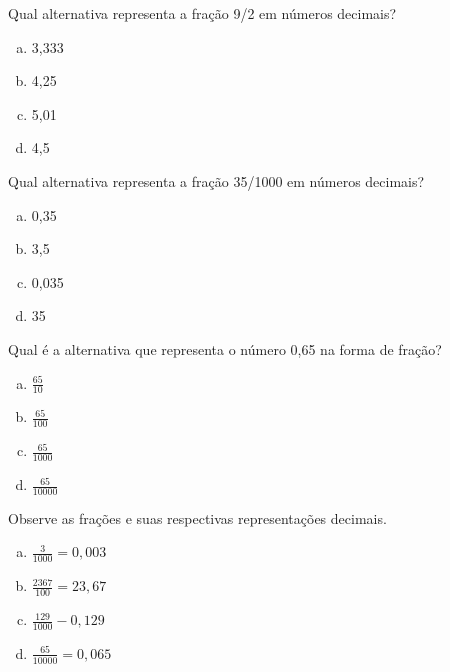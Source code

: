 \item Qual alternativa representa a fração 9/2 em números decimais?
\begin{multicols}{4}
\begin{enumerate}[a)]
	\item 3,333
	\item 4,25
	\item 5,01
	\item 4,5
\end{enumerate}
\end{multicols}

\item Qual alternativa representa a fração 35/1000 em números decimais?
\begin{multicols}{4}
\begin{enumerate}[a)]
	\item 0,35
	\item 3,5
	\item 0,035
	\item 35
\end{enumerate}
\end{multicols}

\item Qual é a alternativa que representa o número 0,65 na forma de fração?
\begin{multicols}{4}
\begin{enumerate}[a)]
	\item $\displaystyle\frac{65}{10}$
	\item $\displaystyle\frac{65}{100}$
	\item $\displaystyle\frac{65}{1000}$
	\item $\displaystyle\frac{65}{10000}$
\end{enumerate}
\end{multicols}

\item Observe as frações e suas respectivas representações decimais.
\begin{multicols}{4}
\begin{enumerate}[a)]
	\item $\displaystyle\frac{3}{1000}=0,003$
	\item $\displaystyle\frac{2367}{100}=23,67$
	\item $\displaystyle\frac{129}{1000}-0,129$
	\item $\displaystyle\frac{65}{10000}=0,065$
\end{enumerate}
\end{multicols}

